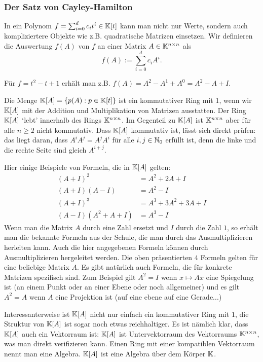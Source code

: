 \subsubsection{Der Satz von Cayley-Hamilton}


In ein Polynom $ f = \sum_{i=0}^{d} c_it^i \in \mathbb K[t] $ kann man nicht nur Werte, sondern auch kompliziertere Objekte wie z.B. quadratische Matrizen einsetzen. Wir definieren die Auswertung $ f(A) $ von $f$ an einer Matrix $A \in \mathbb K^{n \times n}$ als 
\[
	 f(A) := \sum_{i=0}^{d} c_i A^i.
\]

Für $ f = t^2 - t + 1 $ erhält man z.B. $ f(A) = A^2 - A^1 + A^0 = A^2 - A + I $.

\begin{bem}
Die Menge $ \mathbb K[A] = \{ p(A) : p \in \mathbb K[t] \} $ ist ein kommutativer Ring mit 1, wenn wir $\mathbb K[A]$ mit der Addition und Multiplikation von Matrizen ausstatten. Der Ring $\mathbb K[A]$ `lebt' innerhalb des Rings $\mathbb K^{n \times n}$. Im Gegenteil zu $\mathbb K[A]$ ist $\mathbb K^{n \times n}$ aber für alle $n \ge 2$ nicht kommutativ. Dass $\mathbb K[A]$ kommutativ ist, lässt sich direkt prüfen: das liegt daran, dass $A^i A^j = A^j A^i$ für alle $i, j \in \mathbb N_0$ erfüllt ist, denn die linke und die rechte Seite sind gleich $A^{i+j}$.   
\end{bem} 

\begin{bsp}
	Hier einige Beispiele von Formeln, die in $\mathbb K[A]$ gelten: 
	\begin{align*}
			(A + I)^2 & = A^2 + 2 A + I
			\\ (A+I)(A-I) & = A^2 - I
			\\ (A + I)^3 &= A^3 + 3 A^2 + 3 A + I
			\\ (A- I) (A^2 + A + I) & = A^3 - I
	\end{align*}
	Wenn man die Matrix $A$ durch eine Zahl ersetzt und $I$ durch die Zahl $1$, so erhält man die bekannte Formeln aus der Schule, die man durch das Ausmultiplizieren herleiten kann. Auch die hier angegebenen Formeln können durch Ausmultiplizieren hergeleitet werden.  Die oben präsentierten $4$ Formeln gelten für eine beliebige Matrix $A$. Es gibt natürlich auch Formeln, die für konkrete Matrizen spezifisch sind. Zum Beispiel gilt $A^2 = I$ wenn $x \mapsto A x$ eine Spiegelung ist (an einem Punkt oder an einer Ebene oder noch allgemeiner) und es gilt $A^2 = A$ wenn $A$ eine Projektion ist (auf eine ebene auf eine Gerade...)
\end{bsp} 

\begin{bem}
	Interessanterweise ist $\mathbb K[A]$ nicht nur einfach ein kommutativer Ring mit $1$, die Struktur von $\mathbb K[A]$ ist sogar noch etwas reichhaltiger. Es ist nämlich klar, dass $\mathbb K[A]$ auch ein Vektorraum ist: $\mathbb K[A]$ ist Untervektorraum des Vektorraums $\mathbb K^{n \times n}$, was man direkt verifizieren kann. Einen Ring mit einer kompatiblen Vektorraum nennt man eine Algebra. $\mathbb K[A]$ ist eine Algebra über dem Körper $\mathbb K$. 	
\end{bem}


